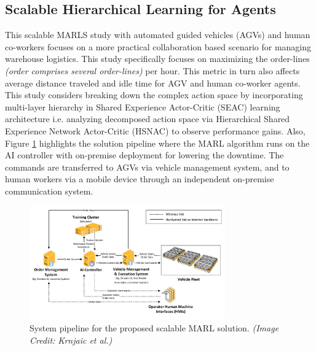 \documentclass{article}
\begin{document}
\subsection{Scalable Hierarchical Learning for Agents}


This scalable MARLS study with automated guided vehicles (AGVs) and human co-workers focuses on a more practical collaboration based scenario for managing warehouse logistics.
This study specifically focuses on maximizing the order-lines \textit{(order comprises several order-lines)} per hour.
This metric in turn also affects average distance traveled and idle time for AGV and human co-worker agents.
This study considers breaking down the complex action space by incorporating multi-layer hierarchy in Shared Experience Actor-Critic (SEAC) learning architecture i.e. analyzing decomposed action space via Hierarchical Shared Experience Network Actor-Critic (HSNAC) to observe performance gains.
Also, Figure \ref{fig:scale-learn-pipeline} highlights the solution pipeline where the MARL algorithm runs on the AI controller with on-premise deployment for lowering the downtime.
The commands are transferred to AGVs via vehicle management system, and to human workers via a mobile device through an independent on-premise communication system.


\begin{figure}[h]
    \centering
    \includegraphics[width=0.75\textwidth]{scalable-rl-learning-example.png}
    \caption{System pipeline for the proposed scalable MARL solution. \textit{(Image Credit: Krnjaic et al.)}}
    \label{fig:scale-learn-pipeline}
\end{figure}


\end{document}
